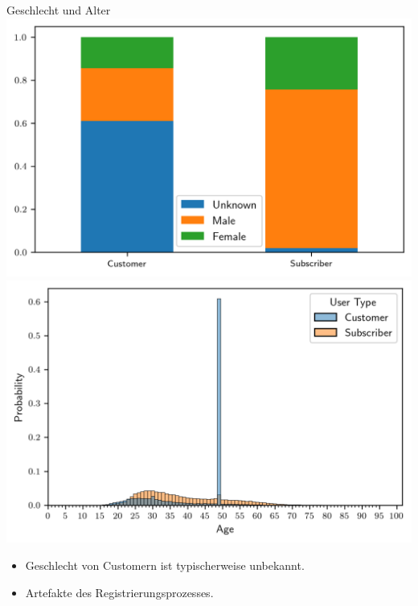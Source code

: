 \begin{frame}{Geschlecht und Alter}
\centering
\includegraphics[height=0.5\textheight]{../Images/GenderComparison}
\includegraphics[height=0.5\textheight]{../Images/AgeDistribution}
{
\begin{itemize}
\item Geschlecht von Customern ist typischerweise unbekannt.
\item Artefakte des Registrierungsprozesses.
\end{itemize}
}
\end{frame}

